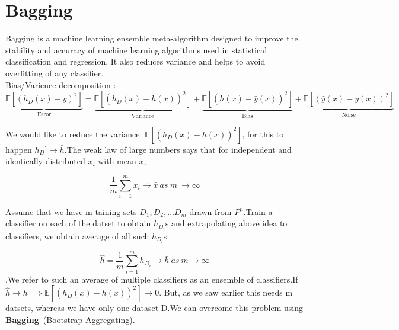 \documentclass[12pt]{article}
\begin{document}
 
 
 
 
 
 
 
 
 
 
 
 
 
 
 
 
 
 
 
 
 
 
 
 
 
 
 
 
 \section{Bagging}
 
 Bagging is a machine learning ensemble meta-algorithm designed to improve the stability and accuracy of machine learning algorithms used in statistical classification and regression. It also reduces variance and helps to avoid overfitting of any classifier. \\ Bias/Varience decomposition :
 $$\underbrace{\mathbb{E}[(h_{D}(x)-y)^{2}]}_\text{Error} = \underbrace{\mathbb{E}[(h_{D}(x) - \bar{h}(x))^{2}]}_\text{Variance} + \underbrace{\mathbb{E}[(\bar{h}(x) - \bar{y}(x))^{2}] }_\text{Bias} + \underbrace{\mathbb{E}[(\bar{y}(x)- y(x))^{2}]}_\text{Noise} $$
 
 
We would like to reduce the variance: ${\mathbb{E}[(h_{D}(x) - \bar{h}(x))^{2}]}$, for this to happen $h_{D} ] \mapsto \bar{h}$.The weak law of large numbers says that for independent and identically distributed $x_{i}$ with mean $\bar{x}$,
 
 $$\frac{1}{m} \sum_{i=1}^{m}x_{i} \rightarrow \bar{x} \ as \ m \ \rightarrow \infty$$
 
Assume that we have m taining sets $D_{1}, D_{2}, \dots D_{m}$ drawn from $P^{n}$.Train a classifier on each of the datset to obtain $h_{D_{i}}$s and extrapolating above idea to classifiers, we obtain  average of all such $h_{D_{i}}$s:

$$\hat{h} = \frac{1}{m} \sum_{i=1}^{m}h_{D_{i}} \rightarrow \bar{h} \ as \ m \rightarrow \infty$$.We refer to such an average of multiple classifiers as an ensemble of classifiers.If $\hat{h} \rightarrow \bar{h} \implies {\mathbb{E}[(h_{D}(x) - \bar{h}(x))^{2}]} \rightarrow 0$. But, as we saw earlier this needs m datsets, whereas we have only one dataset D.We can overcome this problem using \textbf{Bagging}\ (Bootstrap Aggregating).
 
\end{document}
